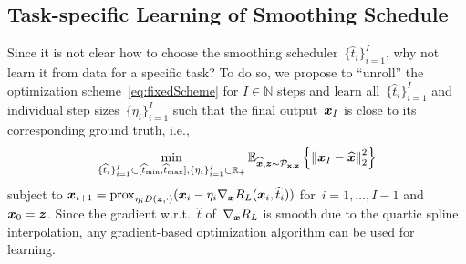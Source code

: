 \documentclass{article}
\newcommand{\N}{\mathbb{N}}
\newcommand{\X}{\mathcal{X}}
\newcommand{\norm}[1]{\left\Vert#1\right\Vert}
\newcommand{\prox}{\mathrm{prox}}
\def\hatt{{\widehat{t}}}
\newcommand{\tminh}{\hatt_\mathrm{min}}
\newcommand{\tmaxh}{\hatt_\mathrm{max}}
\newcommand{\dist}[1]{\mathcal{P}_{#1}}
\theoremstyle{plain}
\theoremstyle{definition}
\theoremstyle{remark}
\begin{document}

\subsection{Task-specific Learning of Smoothing Schedule} \label{sec:learnedVN}
Since it is not clear how to choose the smoothing scheduler~$\{\hatt_i\}_{i=1}^I$, why not learn it from data for a specific task?
To do so, we propose to ``unroll'' the optimization scheme~\eqref{eq:fixedScheme} for $I\in\N$ steps and learn all~$\{\hatt_i\}_{i=1}^I$ and individual step sizes~$\{\eta_i\}_{i=1}^I$ such that the final output~${\bm{x}}_I$ is close to its corresponding ground truth, i.e.,
\[
\min_{\{\hatt_i\}_{i=1}^I\subset[\tminh,\tmaxh],\{\eta_i\}_{i=1}^I\subset\R_+} \E_{\widehat{\vx},\vz\sim\dist{\rvx,\rvz}} \left\{\norm{\vx_I-\widehat{\vx}}_2^2\right\}
\]
subject to $
\vx_{i+1} = \prox_{\eta_i D(\vz,\cdot)}(\vx_i-\eta_i \nabla_\vx R_L(\vx_i,\hatt_i))
$
for~$i=1,\ldots,I-1$ and ${\bm{x}}_0={\bm{z}}$. 
Since the gradient w.r.t.~$\hatt$ of~$\nabla_{\bm{x}} R_L$ is smooth due to the quartic spline interpolation, any gradient-based optimization algorithm can be used for learning.
\end{document}
